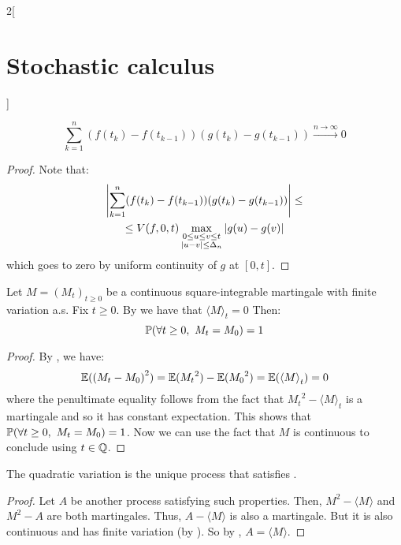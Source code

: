 \documentclass[../../../main_math.tex]{subfiles}
\begin{document}
\begin{multicols}{2}[\section{Stochastic calculus}]
\begin{proposition}
    $$
      \sum_{k=1}^n(f(t_k)-f(t_{k-1}))(g(t_k)-g(t_{k-1}))\overset{n\to\infty}{\longrightarrow}0
    $$
  \end{proposition}
  \begin{proof}
    Note that:
    \begin{multline*}
      \abs{\sum_{k=1}^n(f(t_k)-f(t_{k-1}))(g(t_k)-g(t_{k-1}))}\leq\\\leq V(f,0,t)\max_{\substack{0\leq u\leq v\leq t\\\abs{u-v}\leq \Delta_n}}\abs{g(u)-g(v)}
    \end{multline*}
    which goes to zero by uniform continuity of $g$ at $[0,t]$.
  \end{proof}
  \begin{corollary}\label{SC:corollary_finite_variation}
    Let $M={(M_t)}_{t\geq 0}$ be a continuous square-integrable martingale with finite variation a.s. Fix $t\geq 0$. By  we have that ${\langle M\rangle}_t=0$
    Then:
    $$
      \Prob(\forall t\geq 0,\ M_t=M_0)=1
    $$
  \end{corollary}
  \begin{proof}
    By , we have:
    $$
      \mathbb{E}({(M_t-M_0)}^2)=\mathbb{E}({M_t}^2) - \mathbb{E}({M_0}^2) = \mathbb{E}({\langle M\rangle}_t)=0
    $$
    where the penultimate equality follows from the fact that ${M_t}^2-{\langle M\rangle}_t$ is a martingale and so it has constant expectation. This shows that $\mathbb{P} (\forall t\geq 0,\ M_t=M_0)=1$. Now we can use the fact that $M$ is continuous to conclude using $t\in\mathbb{Q}$.
  \end{proof}
  \begin{proposition}
    The quadratic variation is the unique process that satisfies .
  \end{proposition}
  \begin{proof}
    Let $A$ be another process satisfying such properties. Then, ${M}^2-{\langle M\rangle}$ and ${M}^2-A$ are both martingales. Thus, $A-{\langle M\rangle}$ is also a martingale. But it is also continuous and has finite variation (by ). So by , $A={\langle M\rangle}$.
  \end{proof}

\end{multicols}
\end{document}
